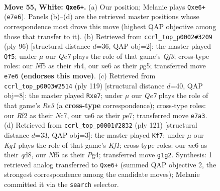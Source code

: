 \documentclass[11pt]{article}
\begin{document}
\clearpage

\begin{figure}[p]\centering
\begin{subfigure}{0.46\textwidth}\centering
\resizebox{\linewidth}{!}{%
\newchessgame
\chessboard[
  setfen={6k1/1p2Q2p/4n3/5N1p/8/8/5R2/6K1 w - - 1 55},
  showmover=false,
  pgfstyle=straightmove, color=movearrow, markmove={e7-e6}
]}
\caption{}
\end{subfigure}\hfill
\begin{subfigure}{0.46\textwidth}\centering
\resizebox{\linewidth}{!}{%
\newchessgame
\chessboard[
  setfen={6k1/5p2/8/6pp/7r/5Q2/K7/8 w - - 0 49},
  showmover=false,
  pgfstyle=straightmove, color=movearrow, markmove={f3-f5}
]}
\caption{}
\end{subfigure}
\\[4pt]
\begin{subfigure}{0.46\textwidth}\centering
\resizebox{\linewidth}{!}{%
\newchessgame
\chessboard[
  setfen={7R/1kn1P3/4r3/8/7p/K1P2P2/7P/8 b - - 0 60},
  showmover=false,
  pgfstyle=straightmove, color=movearrow, markmove={e6-e7}
]}
\caption{}
\end{subfigure}\hfill
\begin{subfigure}{0.46\textwidth}\centering
\resizebox{\linewidth}{!}{%
\newchessgame
\chessboard[
  setfen={3Q1k2/6r1/8/8/4P1p1/8/2q3PP/6K1 b - - 18 61},
  showmover=false,
  pgfstyle=straightmove, color=movearrow, markmove={f8-f7}
]}
\caption{}
\end{subfigure}
\caption{\textbf{Move 55, White: \texttt{Qxe6+}.} (a) Our position; Melanie plays \texttt{Qxe6+} (\texttt{e7e6}). Panels (b)--(d) are the retrieved master positions whose correspondence most drove this move (highest QAP objective among those that transfer to it). (b) Retrieved from \texttt{ccrl\_top\_p0002\#3209} (ply 96) [structural distance $d$=36, QAP obj=2]: the master played \texttt{Qf5}; under $\mu$ our \emph{Qe7} plays the role of that game's \emph{Qf3}; cross-type roles: our \emph{N}f5 as their \emph{r}h4, our \emph{n}e6 as their \emph{p}g5; transferred move \texttt{e7e6} \textbf{(endorses this move)}. (c) Retrieved from \texttt{ccrl\_top\_p0003\#2514} (ply 119) [structural distance $d$=40, QAP obj=8]: the master played \texttt{Rxe7}; under $\mu$ our \emph{Qe7} plays the role of that game's \emph{Re3} (a \textbf{cross-type} correspondence); cross-type roles: our \emph{R}f2 as their \emph{N}c7, our \emph{n}e6 as their \emph{p}e7; transferred move \texttt{e7a3}. (d) Retrieved from \texttt{ccrl\_top\_p0001\#2832} (ply 121) [structural distance $d$=33, QAP obj=3]: the master played \texttt{Kf7}; under $\mu$ our \emph{Kg1} plays the role of that game's \emph{Kf1}; cross-type roles: our \emph{n}e6 as their \emph{q}d8, our \emph{N}f5 as their \emph{P}g4; transferred move \texttt{g1g2}. Synthesis: 1 retrieved analog transferred to \texttt{Qxe6+} (summed QAP objective 2, the strongest correspondence among the candidate moves); Melanie committed it via the \texttt{search} selector.}
\label{fig:thought-m108}
\end{figure}
\end{document}
